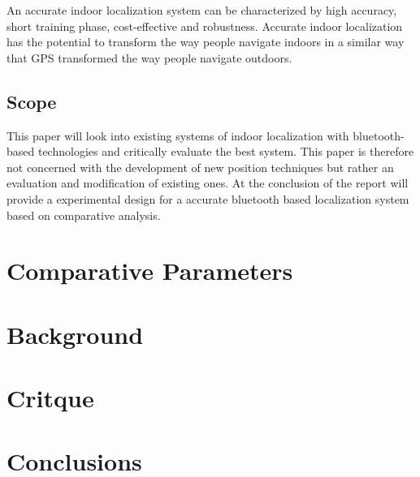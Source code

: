 \documentclass[12pt]{article}
\begin{document}
An accurate indoor localization system can be characterized by high accuracy, short training phase, cost-effective and robustness. Accurate indoor localization has the potential to transform the way people navigate indoors in a similar way that GPS transformed the way people navigate outdoors. \\

\subsection{Scope}
This paper will look into existing systems of indoor localization with bluetooth-based technologies and critically evaluate the best system. This paper is therefore not concerned with the development of new position techniques but rather an evaluation and modification of existing ones. At the conclusion of the report will provide a experimental design for a accurate bluetooth based localization system based on comparative analysis. 


\section*{Comparative Parameters}


\section*{Background}


\section*{Critque}


\section*{Conclusions}



\nocite{*}
\end{document}
